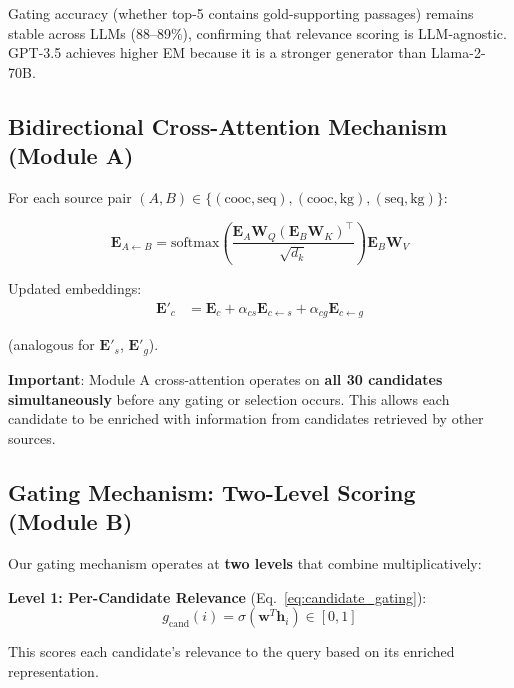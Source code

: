 \documentclass[10pt,twocolumn]{article}
\begin{document}
Gating accuracy (whether top-5 contains gold-supporting passages) remains stable across LLMs (88--89\%), confirming that relevance scoring is LLM-agnostic. GPT-3.5 achieves higher EM because it is a stronger generator than Llama-2-70B.



\subsection{Bidirectional Cross-Attention Mechanism (Module A)}
\label{sec:bidirectional}

For each source pair $(A, B) \in \{(\text{cooc}, \text{seq}), (\text{cooc}, \text{kg}), (\text{seq}, \text{kg})\}$:

\begin{equation}
\mathbf{E}_{A \leftarrow B} = \text{softmax}\left(\frac{\mathbf{E}_A \mathbf{W}_Q (\mathbf{E}_B \mathbf{W}_K)^\top}{\sqrt{d_k}}\right) \mathbf{E}_B \mathbf{W}_V
\end{equation}

Updated embeddings:
\begin{align}
\mathbf{E}'_c &= \mathbf{E}_c + \alpha_{cs}\mathbf{E}_{c \leftarrow s} + \alpha_{cg}\mathbf{E}_{c \leftarrow g}
\end{align}

(analogous for $\mathbf{E}'_s$, $\mathbf{E}'_g$).

\textbf{Important}: Module A cross-attention operates on \textbf{all 30 candidates simultaneously} before any gating or selection occurs. This allows each candidate to be enriched with information from candidates retrieved by other sources.


\subsection{Gating Mechanism: Two-Level Scoring (Module B)}
\label{sec:gating}

Our gating mechanism operates at \textbf{two levels} that combine multiplicatively:

\textbf{Level 1: Per-Candidate Relevance} (Eq.~\ref{eq:candidate_gating}):
\begin{equation}
g_{\text{cand}}(i) = \sigma(\mathbf{w}^T \mathbf{h}_i) \in [0, 1]
\end{equation}

This scores each candidate's relevance to the query based on its enriched representation.
\end{document}
